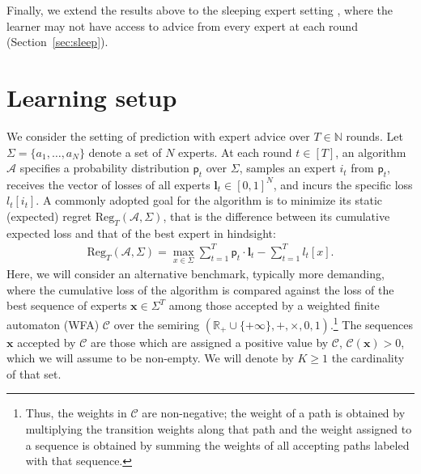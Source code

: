 \documentclass{article}
\newcommand{\sC}{\mathscr C}
\newcommand{\Nset}{\mathbb{N}}
\newcommand{\Rset}{\mathbb{R}}
\newcommand{\bfl}{{\mathbf l}}
\newcommand{\bx}{{\mathbf x}}
\newcommand{\sfp}{{\mathsf p}}
\newcommand{\cA}{\mathcal A}
\newcommand{\Reg}{\mathrm{Reg}}
\newcommand{\set}[2][]{#1 \{ #2 #1 \} }
\newcommand{\ignore}[1]{}
\begin{document}
{Finally, we extend the results above to the sleeping expert setting
\citep{FreundSchapireSingerWarmuth1997}, where the learner may not
have access to advice from every expert at each round
(Section~\ref{sec:sleep}).  \ignore{Finally, we extend the ideas for
prediction with expert advice to online convex optimization and a
general mirror descent setting (Section~\ref{sec:oco}). Here, we
describe a related framework that parallels the previous discussion
and also recovers existing algorithms for $k$-shifting regret.}
}

\section{Learning setup}
\label{sec:setup}

We consider the setting of prediction with expert advice over
$T \in \Nset$ rounds. Let $\Sigma = \set{a_1, \ldots, a_N}$ denote a set
of $N$ experts.  At each round $t \in [T]$, an algorithm $\cA$ specifies
a probability distribution $\sfp_t$ over $\Sigma$, samples an expert
$i_t$ from $\sfp_t$, receives the vector of losses of all experts
$\bfl_t \in [0, 1]^N$, and incurs the specific loss $l_t[i_t]$.  A
commonly adopted goal for the algorithm is to minimize its static
(expected) regret $\Reg_T(\cA, \Sigma)$, that is the difference
between its cumulative expected loss and that of the best expert in
hindsight:
\begin{align}
\label{eq:staticregret}
\Reg_T(\cA, \Sigma) = 
\max_{x \in \Sigma} \sum_{t = 1}^T \sfp_t \cdot \bfl_t - \sum_{t = 1}^T l_t[x].
\end{align}
Here, we will consider an alternative benchmark, typically more
demanding, where the cumulative loss of the algorithm is compared
against the loss of the best sequence of experts
$\bx \in \Sigma^T$ among those accepted by a weighted
finite automaton (WFA) $\sC$ over the semiring
$(\Rset_+ \cup \set{+\infty}, +, \times, 0, 1)$.\footnote{Thus, the
  weights in $\sC$ are non-negative; the weight of a path is
  obtained by multiplying the transition weights along that path and
  the weight assigned to a sequence is obtained by summing the weights
  of all accepting paths labeled with that sequence.} The sequences
$\bx$ accepted by $\sC$ are those which are assigned a positive
value by $\sC$, $\sC(\bx) > 0$, which we will assume to be
non-empty. We will denote by $K \geq 1$ the cardinality of that set.
\end{document}
